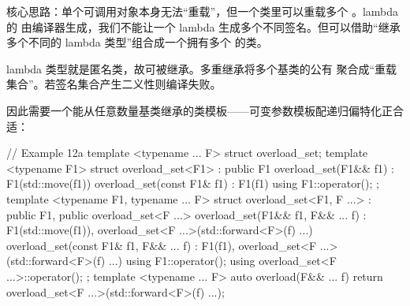 核心思路：单个可调用对象本身无法“重载”，但一个类里可以重载多个 。lambda 的  由编译器生成，我们不能让一个 lambda 生成多个不同签名。但可以借助“继承多个不同的 lambda 类型”组合成一个拥有多个  的类。

lambda 类型就是匿名类，故可被继承。多重继承将多个基类的公有  聚合成“重载集合”。若签名集合产生二义性则编译失败。

因此需要一个能从任意数量基类继承的类模板——可变参数模板配递归偏特化正合适：

\begin{code}
// Example 12a
template <typename ... F> struct overload_set;
template <typename F1>
struct overload_set<F1> : public F1 {
  overload_set(F1&& f1) : F1(std::move(f1)) {}
  overload_set(const F1& f1) : F1(f1) {}
  using F1::operator();
};
template <typename F1, typename ... F>
struct overload_set<F1, F ...> :
    public F1, public overload_set<F ...> {
  overload_set(F1&& f1, F&& ... f) :
    F1(std::move(f1)),
    overload_set<F ...>(std::forward<F>(f) ...) {}
  overload_set(const F1& f1, F&& ... f) :
    F1(f1), overload_set<F ...>(std::forward<F>(f) ...) {}
  using F1::operator();
  using overload_set<F ...>::operator();
};
template <typename ... F> auto overload(F&& ... f) {
  return overload_set<F ...>(std::forward<F>(f) ...);
}
\end{code}

